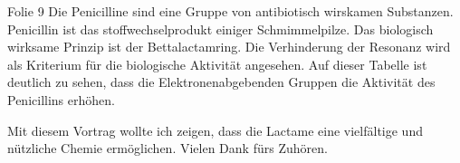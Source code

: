 \documentclass{article}
\begin{document}
Folie 9
Die Penicilline sind eine Gruppe von antibiotisch wirskamen Substanzen. Penicillin ist das stoffwechselprodukt einiger Schmimmelpilze. Das biologisch wirksame Prinzip ist der Bettalactamring. Die Verhinderung der Resonanz wird als Kriterium für die biologische Aktivität angesehen. Auf dieser Tabelle ist deutlich zu sehen, dass die Elektronenabgebenden Gruppen die Aktivität des Penicillins erhöhen. 


Mit diesem Vortrag wollte ich zeigen, dass die Lactame eine vielfältige und nützliche Chemie ermöglichen.
Vielen Dank fürs Zuhören. 
\end{document}
